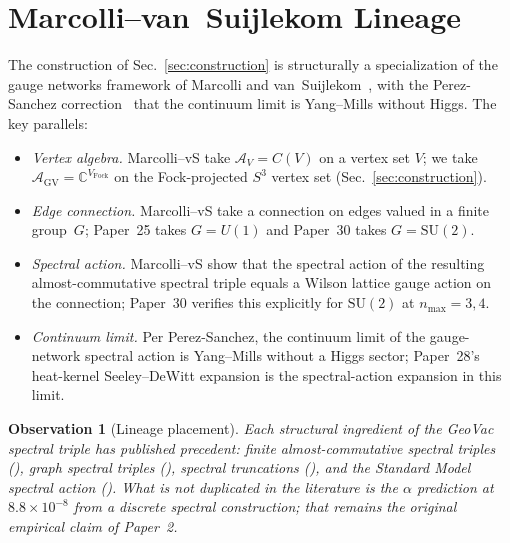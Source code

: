 \documentclass[11pt]{article}
\newtheorem{observation}{Observation}
\begin{document}
\section{Marcolli--van~Suijlekom Lineage}
\label{sec:lineage}

The construction of Sec.~\ref{sec:construction} is structurally a
specialization of the gauge networks framework of Marcolli and
van~Suijlekom~\cite{marcolli_vs2014}, with the
Perez-Sanchez correction~\cite{perez_sanchez2024,perez_sanchez2025}
that the continuum limit is Yang--Mills without Higgs.  The key
parallels:

\begin{itemize}\setlength{\itemsep}{2pt}
\item \emph{Vertex algebra.}  Marcolli--vS take $\mathcal{A}_V = C(V)$
on a vertex set $V$; we take $\mathcal{A}_{\mathrm{GV}} = \mathbb{C}^{V_{\mathrm{Fock}}}$
on the Fock-projected $S^3$ vertex set (Sec.~\ref{sec:construction}).
\item \emph{Edge connection.}  Marcolli--vS take a connection on
edges valued in a finite group~$G$; Paper~25 takes $G = U(1)$ and
Paper~30 takes $G = \mathrm{SU}(2)$.
\item \emph{Spectral action.}  Marcolli--vS show that the spectral
action of the resulting almost-commutative spectral triple equals a
Wilson lattice gauge action on the connection; Paper~30 verifies this
explicitly for $\mathrm{SU}(2)$ at $n_{\max} = 3, 4$.
\item \emph{Continuum limit.}  Per Perez-Sanchez, the continuum limit
of the gauge-network spectral action is Yang--Mills without a Higgs
sector; Paper~28's heat-kernel Seeley--DeWitt expansion is the
spectral-action expansion in this limit.
\end{itemize}

\begin{observation}[Lineage placement]
\label{obs:lineage}
Each structural ingredient of the GeoVac spectral triple has published
precedent: finite almost-commutative spectral triples
(\cite{krajewski1998,paschke_sitarz2000,cacic2009}), graph spectral
triples (\cite{marcolli_vs2014,perez_sanchez2024}), spectral
truncations (\cite{connes_vs2021,hekkelman2022,hekkelman_mcdonald2024}), and
the Standard Model spectral action (\cite{chamseddine_connes2010}).
What is not duplicated in the literature is the $\alpha$ prediction at
$8.8 \times 10^{-8}$ from a discrete spectral construction; that
remains the original empirical claim of Paper~2.
\end{observation}
\end{document}
